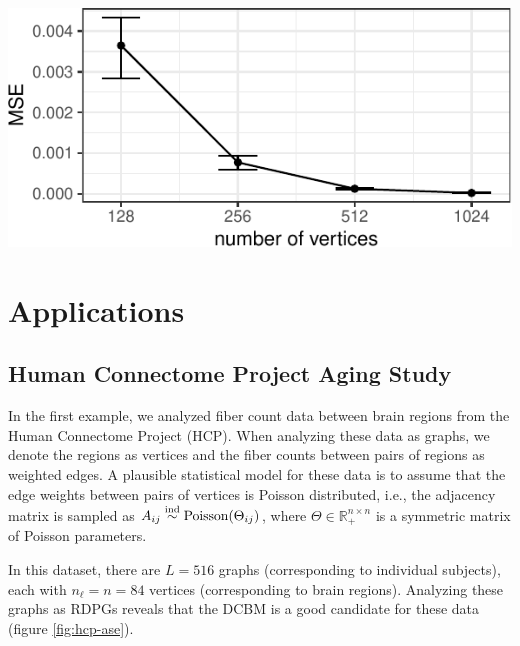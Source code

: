 \documentclass[12pt]{article}
\begin{document}
\begin{center}\includegraphics{draft_files/figure-latex/angle-reg-results-1} \end{center}

\hypertarget{applications}{%
\section{Applications}\label{applications}}

\hypertarget{human-connectome-project-aging-study}{%
\subsection{Human Connectome Project Aging
Study}\label{human-connectome-project-aging-study}}

In the first example, we analyzed fiber count data between brain regions
from the Human Connectome Project (HCP). When analyzing these data as
graphs, we denote the regions as vertices and the fiber counts between
pairs of regions as weighted edges. A plausible statistical model for
these data is to assume that the edge weights between pairs of vertices
is Poisson distributed, i.e., the adjacency matrix is sampled as
\(A_{ij} \stackrel{\mathrm{ind}}{\sim} \mathrm{Poisson}(\Theta_{ij})\), where
\(\Theta \in \mathbb{R}_+^{n \times n}\) is a symmetric matrix of
Poisson parameters.

In this dataset, there are \(L = 516\) graphs (corresponding to
individual subjects), each with \(n_\ell = n = 84\) vertices
(corresponding to brain regions). Analyzing these graphs as RDPGs
reveals that the DCBM is a good candidate for these data (figure
\ref{fig:hcp-ase}).
\end{document}
